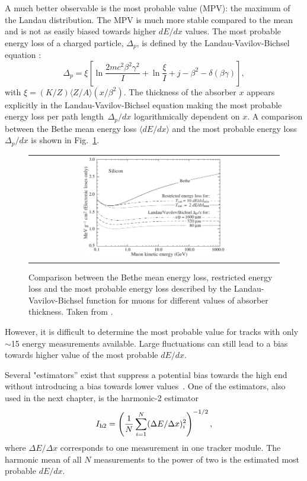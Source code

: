 A much better observable is the most probable value (MPV): the maximum of the Landau distribution.
The MPV is much more stable compared to the mean and is not as easily biased towards higher $dE/dx$ values. 
The most probable energy loss of a charged particle, $\Delta_p$, is defined by the Landau-Vavilov-Bichsel equation \cite{bib:Bichsel:MPV_1988}:
\begin{equation}
\Delta_p = \xi \left[ \ln \frac{2mc^2\beta^2\gamma^2}{I}  + \ln\frac{\xi}{I} + j - \beta^2 - \delta(\beta\gamma)  \right],
\label{eq:Landau_Vavilov_Bichsel}
\end{equation}
with $\xi=(K/Z)\langle Z/A \rangle (x/\beta^2)$. 
The thickness of the absorber $x$ appears explicitly in the Landau-Vavilov-Bichsel equation making the most probable energy loss per path \mbox{length $\Delta_p/dx$} logarithmically dependent on $x$.
A comparison between the Bethe mean energy loss $\langle dE/dx \rangle$ and the most probable energy loss $\Delta_p/dx$ is shown in Fig.~\ref{fig:dEdx_Bethe_Landau}.


\begin{figure}[!bt]
  \centering 
  \begin{tabular}{c}
  \includegraphics[width=0.6\textwidth]{figures/analysis/dEdx_Bethe_Landau.png}
  \end{tabular}
  \caption{Comparison between the Bethe mean energy loss, restricted energy loss and the most probable energy loss described by the Landau-Vavilov-Bichsel function for muons for different values of absorber thickness. 
           Taken from \cite{bib:PDG_2014}.} 
  \label{fig:dEdx_Bethe_Landau}
\end{figure}
However, it is difficult to determine the most probable value for tracks with only $\sim$15 energy measurements available.
Large fluctuations can still lead to a bias towards higher value of the most probable $dE/dx$.

Several "estimators'' exist that suppress a potential bias towards the high end without introducing a bias towards lower values~\cite{bib:Quertenmont_2010}.
One of the estimators, also used in the next chapter, is the harmonic-2 estimator
\begin{equation}
I_{\text{h2}}=\left( \frac{1}{N}\sum_{i=1}^{N}(\Delta E/\Delta x)_i^2 \right)^{-1/2},
\label{eq:Harmonic2Estimator}
\end{equation}
where $\Delta E /\Delta x$ corresponds to one measurement in one tracker module. 
The harmonic mean of all $N$ measurements to the power of two is the estimated most probable $dE/dx$.\\

